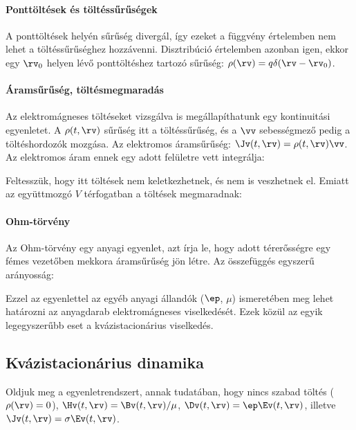   \paragraph{Ponttöltések és töltéssűrűségek}
   
   A ponttöltések helyén sűrűség divergál, így ezeket a függvény értelemben nem lehet a töltéssűrűséghez hozzávenni.
   Disztribúció értelemben azonban igen, ekkor egy $\rv_0$ helyen lévő ponttöltéshez tartozó sűrűség: $\rho(\rv)=q\delta(\rv-\rv_0)$. 
   
  \paragraph{Áramsűrűség, töltésmegmaradás}
   
   Az elektromágneses töltéseket vizsgálva is megállapíthatunk egy kontinuitási egyenletet.
   A $\rho(t,\rv)$ sűrűség itt a töltéssűrűség, és a $\vv$ sebességmező pedig a töltéshordozók mozgása.
   Az elektromos áramsűrűség: $\Jv(t,\rv)=\rho(t,\rv)\vv$.
   Az elektromos áram ennek egy adott felületre vett integrálja:
   
   Feltesszük, hogy itt töltések nem keletkezhetnek, és nem is veszhetnek el.
   Emiatt az együttmozgó $V$ térfogatban a töltések megmaradnak:
   
  \paragraph{Ohm-törvény}
   
   Az Ohm-törvény egy anyagi egyenlet, azt írja le, hogy adott térerősségre egy fémes vezetőben mekkora áramsűrűség jön létre.
   Az összefüggés egyszerű arányosság:
   
   Ezzel az egyenlettel az egyéb anyagi állandók ($\ep$, $\mu$) ismeretében meg lehet határozni az anyagdarab elektromágneses viselkedését.
   Ezek közül az egyik legegyszerűbb eset a kvázistacionárius  viselkedés.
   
  \subsection{Kvázistacionárius dinamika}\label{ss:08-kvazistacdin}
   
   Oldjuk meg a 
   egyenletrendszert, annak tudatában, hogy nincs szabad töltés ($\rho(\rv)=0$), $\Hv(t,\rv)=\Bv(t,\rv)/\mu$, $\Dv(t,\rv)=\ep\Ev(t,\rv)$, illetve $\Jv(t,\rv)=\sigma\Ev(t,\rv)$.
   
